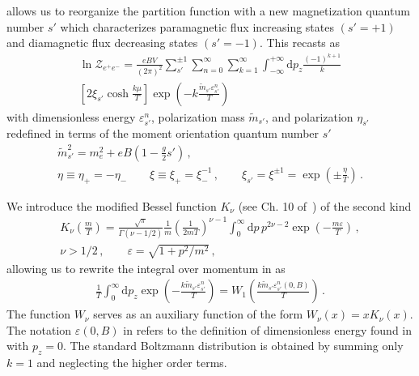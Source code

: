 allows us to reorganize the partition function with a new magnetization quantum number $s'$ which characterizes paramagnetic flux increasing states $(s'=+1)$ and diamagnetic flux decreasing states $(s'=-1)$. This recasts  as
\begin{multline}
    \label{partitionpower:4}
    \ln{\mathcal{Z}_{e^{+}e^{-}}}=\frac{e{B}V}{(2\pi)^{2}}\sum_{s'}^{\pm1}\sum_{n=0}^{\infty}\sum_{k=1}^{\infty}\int_{-\infty}^{+\infty}\mathrm{d}p_{z}\frac{(-1)^{k+1}}{k}\\
    \left[2\xi_{s'}\cosh\frac{k\mu}{T}\right]\exp\left(-k\frac{{\tilde m}_{s'}\varepsilon_{s'}^{n}}{T}\right)
\end{multline}
with dimensionless energy $\varepsilon_{s'}^{n}$, polarization mass $\tilde{m}_{s'}$, and polarization $\eta_{s'}$ redefined in terms of the moment orientation quantum number $s'$
\begin{gather}
    {\tilde m}_{s'}^{2}=m_{e}^{2}+e{B}\left(1-\frac{g}{2}s'\right)\,,\\
    \eta\equiv\eta_{+}=-\eta_{-}\qquad\xi\equiv\xi_{+}=\xi_{-}^{-1}\,,\qquad\xi_{s'}=\xi^{\pm1}=\exp\left(\pm\frac{\eta}{T}\right)\,.
\end{gather}

We introduce the modified Bessel function $K_{\nu}$ (see Ch. 10 of~\cite{Letessier:2002ony}) of the second kind
\begin{gather}
\label{besselk}
K_{\nu}\left(\frac{m}{T}\right)=\frac{\sqrt{\pi}}{\Gamma(\nu-1/2)}\frac{1}{m}\left(\frac{1}{2mT}\right)^{\nu-1}
\int_{0}^{\infty}\mathrm{d}p\,p^{2\nu-2}\exp\left({-\frac{m\varepsilon}{T}}\right)\,,\\
\nu>1/2\,,\qquad\varepsilon=\sqrt{1+p^{2}/m^{2}}\,,
\end{gather}
allowing us to rewrite the integral over momentum in  as
\begin{align}
 \label{besselkint}
 \frac{1}{T}\int_{0}^{\infty}\!\!\mathrm{d}p_{z}\exp\!\left(\!{-\frac{k{\tilde m}_{s'}\varepsilon_{s'}^{n}}{T}}\!\right)\!=\!W_{1}\!\!\left(\frac{k{\tilde m}_{s'}\varepsilon_{s'}^{n}(0,{B})}{T}\right)\,.
\end{align}
The function $W_{\nu}$ serves as an auxiliary function of the form $W_{\nu}(x)=xK_{\nu}(x)$. The notation $\varepsilon(0,{B})$ in  refers to the definition of dimensionless energy found in  with $p_{z}=0$. The standard Boltzmann distribution is obtained by summing only $k=1$ and neglecting the higher order terms.

